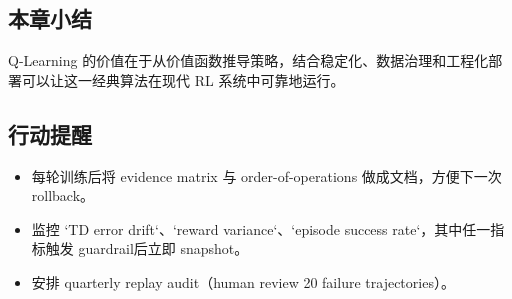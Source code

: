 \documentclass[a4paper]{article}
\begin{document}
\subsection{本章小结}

Q-Learning 的价值在于从价值函数推导策略，结合稳定化、数据治理和工程化部署可以让这一经典算法在现代 RL 系统中可靠地运行。

\subsection{行动提醒}

\begin{itemize}
    \item 每轮训练后将 evidence matrix 与 order-of-operations 做成文档，方便下一次 rollback。
    \item 监控 `TD error drift`、`reward variance`、`episode success rate`，其中任一指标触发 guardrail后立即 snapshot。
    \item 安排 quarterly replay audit（human review 20 failure trajectories）。
\end{itemize}
\end{document}
